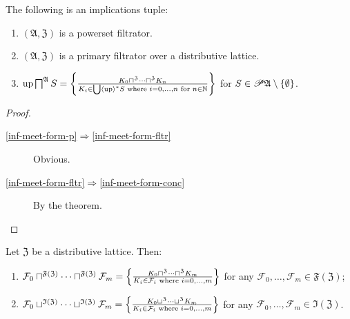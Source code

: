 \begin{cor}
\label{f-inf-meet-form}The following is an implications tuple:
\begin{enumerate}
\item \label{inf-meet-form-p}$(\mathfrak{A},\mathfrak{Z})$ is a powerset
filtrator.
\item \label{inf-meet-form-fltr}$(\mathfrak{A},\mathfrak{Z})$ is a primary
filtrator over a distributive lattice.
\item \label{inf-meet-form-conc}$\operatorname{up}\bigsqcap^{\mathfrak{A}}S=\left\{ \frac{K_{0}\sqcap^{\mathfrak{Z}}\dots\sqcap^{\mathfrak{Z}}K_{n}}{K_{i}\in\bigcup\left\langle \operatorname{up}\right\rangle ^{\ast}S\text{ where }i=0,\dots,n\text{ for }n\in\mathbb{N}}\right\}$
for $S\in\mathscr{P}\mathfrak{A}\setminus\{\emptyset\}$.
\end{enumerate}
\end{cor}
\begin{proof}
~
\begin{description}
\item [{\ref{inf-meet-form-p}$\Rightarrow$\ref{inf-meet-form-fltr}}] Obvious.
\item [{\ref{inf-meet-form-fltr}$\Rightarrow$\ref{inf-meet-form-conc}}] By
the theorem.
\end{description}
\end{proof}
\begin{thm}
Let $\mathfrak{Z}$ be a distributive lattice. Then:
\begin{enumerate}
\item $\mathcal{F}_{0}\sqcap^{\mathfrak{F}(\mathfrak{Z})}\dots\sqcap^{\mathfrak{F}(\mathfrak{Z})}\mathcal{F}_{m}=\left\{ \frac{K_{0}\sqcap^{\mathfrak{Z}}\dots\sqcap^{\mathfrak{Z}}K_{m}}{K_{i}\in\mathcal{F}_{i}\text{ where }i=0,\dots,m}\right\}$
for any $\mathcal{F}_{0},\dots,\mathcal{F}_{m}\in\mathfrak{F}(\mathfrak{Z})$;
\item $\mathcal{F}_{0}\sqcup^{\mathfrak{I}(\mathfrak{Z})}\dots\sqcup^{\mathfrak{I}(\mathfrak{Z})}\mathcal{F}_{m}=\left\{ \frac{K_{0}\sqcup^{\mathfrak{Z}}\dots\sqcup^{\mathfrak{Z}}K_{m}}{K_{i}\in\mathcal{F}_{i}\text{ where }i=0,\dots,m}\right\}$
for any $\mathcal{F}_{0},\dots,\mathcal{F}_{m}\in\mathfrak{I}(\mathfrak{Z})$.
\end{enumerate}
\end{thm}
